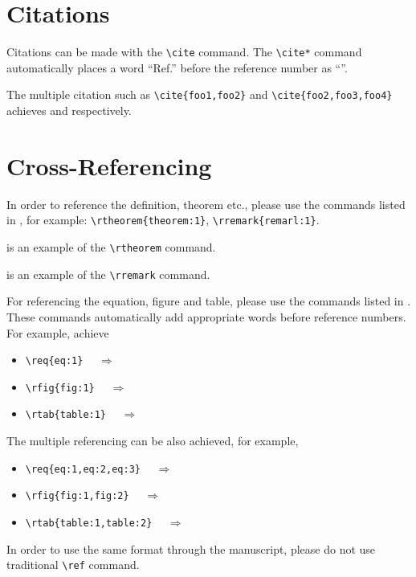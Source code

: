 \section{Citations}
Citations can be made with the \verb+\cite+ command\cite{foo1}. 
The \verb+\cite*+ command automatically places a word ``Ref.''
before the reference number as ``\cite*{foo1}''.

The multiple citation such as
\verb+\cite{foo1,foo2}+ and \verb+\cite{foo2,foo3,foo4}+ 
achieves \mbox{}\cite{foo1,foo2} and \mbox{}\cite{foo2,foo3,foo4} respectively.


\section{Cross-Referencing}
In order to reference the definition, theorem etc.,
please use the commands listed in ,
for example: \verb+\rtheorem{theorem:1}+, \verb+\rremark{remarl:1}+.

 is an example of the \verb+\rtheorem+ command.

 is an example of the \verb+\rremark+ command.

For referencing the equation,
figure and table, please use the commands listed in .
These commands automatically add appropriate words before reference numbers.
For example, 
achieve 

\begin{itemize}
  \item \verb+\req{eq:1}+ $\quad\Longrightarrow\quad$ 
  \item \verb+\rfig{fig:1}+ $\quad\Longrightarrow\quad$ 
  \item \verb+\rtab{table:1}+ $\quad\Longrightarrow\quad$ 
\end{itemize}
The multiple referencing can be also achieved, for example,
\begin{itemize}
  \item \verb+\req{eq:1,eq:2,eq:3}+ $\quad\Longrightarrow\quad$
  \item \verb+\rfig{fig:1,fig:2}+ $\quad\Longrightarrow\quad$ 
  \item \verb+\rtab{table:1,table:2}+ $\quad\Longrightarrow\quad$
\end{itemize}
In order to use the same format through the manuscript,
please do not use traditional 
\verb+\ref+ command.


